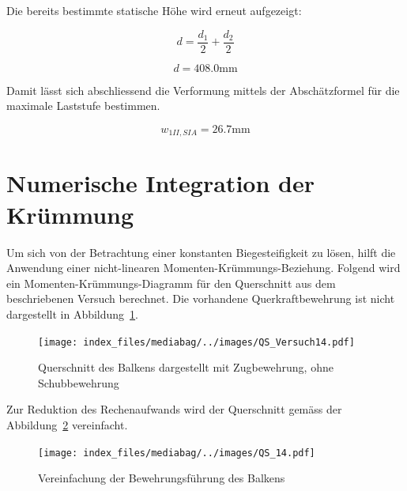 \documentclass[
  12pt,
  letterpaper,
  egregdoesnotlikesansseriftitles]{scrreprt}
\begin{document}
Die bereits bestimmte statische Höhe wird erneut aufgezeigt:

\begin{equation}d = \frac{d_{1}}{2} + \frac{d_{2}}{2}\end{equation}

\begin{equation}d = 408.0 \text{mm}\end{equation}

Damit lässt sich abschliessend die Verformung mittels der Abschätzformel
für die maximale Laststufe bestimmen.

\begin{equation}w_{1 II,SIA} = 26.7 \text{mm}\end{equation}

\hypertarget{numerische-integration-der-kruxfcmmung-1}{%
\section{Numerische Integration der
Krümmung}\label{numerische-integration-der-kruxfcmmung-1}}

Um sich von der Betrachtung einer konstanten Biegesteifigkeit zu lösen,
hilft die Anwendung einer nicht-linearen Momenten-Krümmungs-Beziehung.
Folgend wird ein Momenten-Krümmungs-Diagramm für den Querschnitt aus dem
beschriebenen Versuch berechnet. Die vorhandene Querkraftbewehrung ist
nicht dargestellt in Abbildung~\ref{fig-qs_sv14}.

\begin{figure}[H]

{\centering \texttt{[image: index\_files/mediabag/../images/QS\_Versuch14.pdf]}

}

\caption{\label{fig-qs_sv14}Querschnitt des Balkens dargestellt mit
Zugbewehrung, ohne Schubbewehrung}

\end{figure}

Zur Reduktion des Rechenaufwands wird der Querschnitt gemäss der
Abbildung~\ref{fig-qs_sv14_vereinfachung} vereinfacht.

\begin{figure}[H]

{\centering \texttt{[image: index\_files/mediabag/../images/QS\_14.pdf]}

}

\caption{\label{fig-qs_sv14_vereinfachung}Vereinfachung der
Bewehrungsführung des Balkens}

\end{figure}
\end{document}
